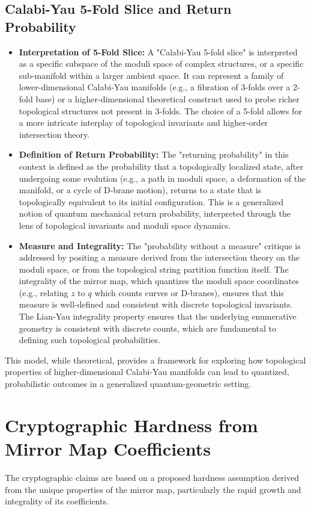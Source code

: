 \documentclass{book}
\newcommand{\qexp}{q} %
\newcommand{\zmod}{z} %
\theoremstyle{definition}
\begin{document}
\subsection{Calabi-Yau 5-Fold Slice and Return Probability}
\begin{itemize}
    \item \textbf{Interpretation of 5-Fold Slice:} A "Calabi-Yau 5-fold slice" is interpreted as a specific subspace of the moduli space of complex structures, or a specific sub-manifold within a larger ambient space. It can represent a family of lower-dimensional Calabi-Yau manifolds (e.g., a fibration of 3-folds over a 2-fold base) or a higher-dimensional theoretical construct used to probe richer topological structures not present in 3-folds. The choice of a 5-fold allows for a more intricate interplay of topological invariants and higher-order intersection theory.
    \item \textbf{Definition of Return Probability:} The "returning probability" in this context is defined as the probability that a topologically localized state, after undergoing some evolution (e.g., a path in moduli space, a deformation of the manifold, or a cycle of D-brane motion), returns to a state that is topologically equivalent to its initial configuration. This is a generalized notion of quantum mechanical return probability, interpreted through the lens of topological invariants and moduli space dynamics.
    \item \textbf{Measure and Integrality:} The "probability without a measure" critique is addressed by positing a measure derived from the intersection theory on the moduli space, or from the topological string partition function itself. The integrality of the mirror map, which quantizes the moduli space coordinates (e.g., relating $\zmod$ to $\qexp$ which counts curves or D-branes), ensures that this measure is well-defined and consistent with discrete topological invariants. The Lian-Yau integrality property ensures that the underlying enumerative geometry is consistent with discrete counts, which are fundamental to defining such topological probabilities.
\end{itemize}
This model, while theoretical, provides a framework for exploring how topological properties of higher-dimensional Calabi-Yau manifolds can lead to quantized, probabilistic outcomes in a generalized quantum-geometric setting.

\section{Cryptographic Hardness from Mirror Map Coefficients}
The cryptographic claims are based on a proposed hardness assumption derived from the unique properties of the mirror map, particularly the rapid growth and integrality of its coefficients.
\end{document}
